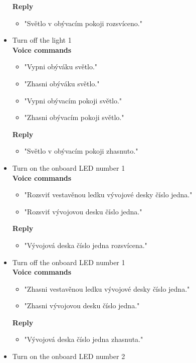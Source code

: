\begin{itemize}
\begin{itemize}
    \end{itemize}
    \textbf{Reply}
    \begin{itemize}
        \item "Světlo v obývacím pokoji rozsvíceno."
    \end{itemize} 
    \item Turn off the light 1\\
    \textbf{Voice commands}
    \begin{itemize}
        \item "Vypni obýváku světlo."
        \item "Zhasni obýváku světlo."
        \item "Vypni obývacím pokoji světlo."
        \item "Zhasni obývacím pokoji světlo."
    \end{itemize}
    \textbf{Reply}
    \begin{itemize}
        \item "Světlo v obývacím pokoji zhasnuto."
    \end{itemize} 
    \item Turn on the onboard LED number 1\\
    \textbf{Voice commands}
    \begin{itemize}
        \item "Rozsviť vestavěnou ledku vývojové desky číslo jedna."
        \item "Rozsviť vývojovou desku číslo jedna."
    \end{itemize}
    \textbf{Reply}
    \begin{itemize}
        \item "Vývojová deska číslo jedna rozsvícena."
    \end{itemize} 
    \item Turn off the onboard LED number 1\\
    \textbf{Voice commands}
    \begin{itemize}
        \item "Zhasni vestavěnou ledku vývojové desky číslo jedna."
        \item "Zhasni vývojovou desku číslo jedna."
    \end{itemize}
    \textbf{Reply}
    \begin{itemize}
        \item "Vývojová deska číslo jedna zhasnuta."
    \end{itemize}
    \item Turn on the onboard LED number 2\\

\end{itemize}
